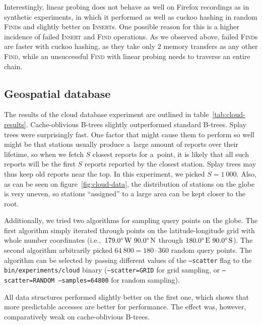 Interestingly, linear probing does not behave as well on Firefox recordings
as in synthetic experiments, in which it performed as well as cuckoo hashing
in random \textsc{Find}s and slightly better on \textsc{Insert}s. One possible
reason for this is a higher incidence of failed \textsc{Insert} and
\textsc{Find} operations. As we observed above, failed \textsc{Find}s are
faster with cuckoo hashing, as they take only 2 memory transfers as any other
\textsc{Find}, while an unsuccessful \textsc{Find} with linear probing needs to
traverse an entire chain.

\subsection{Geospatial database}
The results of the cloud database experiment are outlined in
table~\ref{tab:cloud-results}. Cache-oblivious \mbox{B-trees} slightly outperformed
standard \mbox{B-trees}. Splay trees were surprisingly fast. One factor that
might cause them to perform so well might be that stations usually produce
a~large amount of reports over their lifetime, so when we fetch $S$ closest
reports for a~point, it is likely that all such reports will be the first $S$
reports reported by the closest station. Splay trees may thus keep old reports
near the top. In this experiment, we picked $S=1~000$. Also, as can be
seen on figure~\ref{fig:cloud-data}, the distribution of stations on the globe
is very uneven, so stations ``assigned'' to a large area can be kept closer to
the root.

Additionally, we tried two algorithms for sampling query points on the globe.
The first algorithm simply iterated through points on the latitude-longitude
grid with whole number coordinates (i.e.,\
$179.0\degree\,\text{W}\ 90.0\degree\,\text{N}$ through
$180.0\degree\,\text{E}\ 90.0\degree\,\text{S}$).
The second algorithm arbitrarily picked $64~800=180\cdot 360$ random query
points.
The algorithm can be selected by passing different values of the
\texttt{--scatter} flag to the \texttt{bin/experiments/cloud} binary
(\texttt{--scatter=GRID} for grid sampling, or \texttt{--scatter=RANDOM
--samples=64800} for random sampling).

All data structures performed slightly better on the first one, which shows
that more predictable accesses are better for performance. The effect was,
however, comparatively weak on cache-oblivious B-trees.

